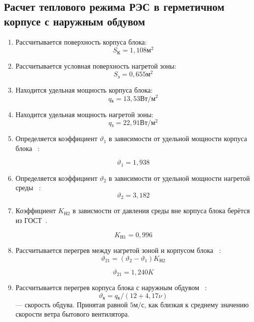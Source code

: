 \subsection{Расчет теплового режима РЭС в герметичном корпусе с наружным обдувом}

\begin{enumerate}[label={\arabic*.}]
\item Рассчитывается поверхность корпуса блока: %
  $$S\mathrm{_{К}}=1,108\mathrm{м^2}$$

\item Рассчитывается условная поверхность нагретой зоны: %
  $$S\mathrm{_{з}} = 0,655\mathrm{м^2}$$ 
\item Находится удельная мощность корпуса блока:  %
  $$q\mathrm{_к} = 13,53\mathrm{Вт/м^2}$$

\item Находится удельная мощность нагретой зоны: %
  $$q\mathrm{_з} = 22,91 \mathrm{ Вт/м^2}$$

\item Определяется коэффициент $\vartheta_1$ в зависимости от удельной мощности корпуса блока ~\cite{Rotkop1976}:

  $$\vartheta_1=1,938$$
\item Определяется коэффициент $\vartheta_2$ в зависимости от удельной мощности нагретой среды ~\cite{Rotkop1976}:
  $$\vartheta_2=3,182$$
  

\item Коэффициент $K\mathrm{_{Н2}}$ в зависмости от давления
  среды вне корпуса блока берётся из ГОСТ~\cite{GOST_15150-69}.

  $$K\mathrm{_{Н1}} = 0,996$$

\item Рассчитывается перегрев между нагретой зоной и корпусом блока
  ~\cite{Rotkop1976}:
  \begin{equation}
    \vartheta_{21} = (\vartheta_{2}-\vartheta_{1})K\mathrm{_{Н2}}
    \end{equation}

    $$\vartheta_{21}=1,240 K$$

\item Рассчитывается перегрев корпуса блока с наружным обдувом
    ~\cite{Rotkop1976}:
    \begin{equation}
      \vartheta\mathrm{_к} = q\mathrm{_к}/(12 + 4,17 \nu)
      \end{equation}
      \nu — скорость обдува. Принятая равной $5\mathrm{м/с}$,
      как близкая к среднему значению скорости ветра бытового
вентилятора.


\end{enumerate}
